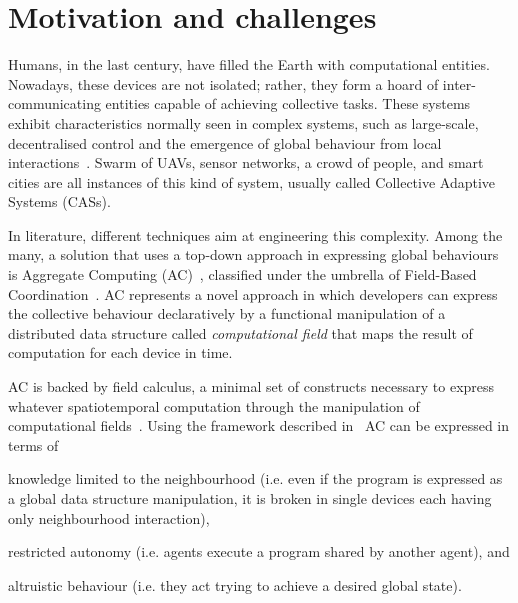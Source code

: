 \documentclass[conference]{IEEEtran}
\begin{document}
\section{Motivation and challenges}
Humans, in the last century, have filled the Earth with computational entities. 
%
%
Nowadays, these devices are not isolated; rather, they form a hoard of inter-communicating entities capable of achieving collective tasks.
% 
These systems exhibit characteristics normally seen in complex systems, such as large-scale, decentralised control and the emergence of global behaviour from local interactions~\cite{DBLP:conf/huc/Ferscha15}.
% 
Swarm of UAVs, sensor networks, a crowd of people, and smart cities are all instances of this kind of system, usually called Collective Adaptive Systems (CASs).

In literature, different techniques aim at engineering this complexity.
%
Among the many, a solution that uses a top-down approach in expressing global behaviours is Aggregate Computing (AC)~\cite{DBLP:journals/computer/BealPV15}, classified under the umbrella of Field-Based Coordination~\cite{DBLP:books/daglib/0015276}.
%
AC represents a novel approach in which developers can express the collective behaviour declaratively by a functional manipulation of a distributed data structure called \emph{computational field} that maps the result of computation for each device in time.

AC is backed by field calculus, a minimal set of constructs necessary to express whatever spatiotemporal computation through the manipulation of computational fields~\cite{DBLP:conf/coordination/AudritoBDV18}. 
%
Using the framework described in~\cite{DAngelo2019} AC can be expressed in terms of 
\begin{enumerate*}[label=(\roman*)]
    \item knowledge limited to the neighbourhood  (i.e. even if the program is expressed as a global data structure manipulation, it is broken in single devices each having only neighbourhood interaction), 
    \item restricted autonomy (i.e. agents execute a program shared by another agent), and 
    \item altruistic behaviour (i.e. they act trying to achieve a desired global state).
\end{enumerate*}
\end{document}
